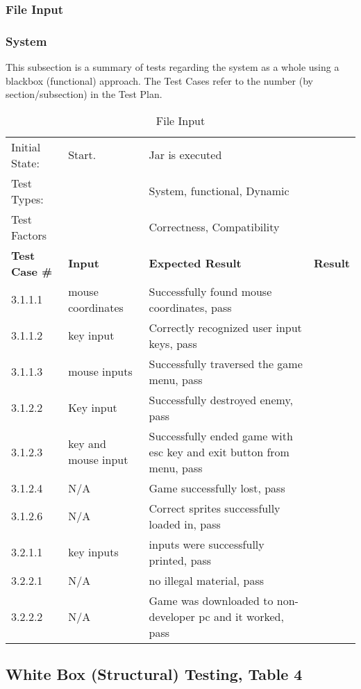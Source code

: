 \documentclass[12pt, oneside]{article}
\begin{document}
\subsubsection{File Input}

\subsubsection{System}
This subsection is a summary of tests regarding the system as a whole using a blackbox (functional) approach.  The Test Cases refer to the number (by section/subsection) in the Test Plan.

\begin{table}[ht]
\label{fin}
\caption{File Input}
\begin{tabular}{|p{} || p{} || p{} || p{}|}
\hline
Initial State: & Start.  &  Jar is executed  & \\
Test Types: & & System, functional, Dynamic & \\
Test Factors & & Correctness, Compatibility & \\
\hline
\hline
\textbf{Test Case \#} & \textbf{Input} & \textbf{Expected Result} & \textbf{Result} \\
\hline
3.1.1.1 & mouse coordinates & Successfully found mouse coordinates, pass \\
3.1.1.2 & key input & Correctly recognized user input keys, pass \\
3.1.1.3 & mouse inputs & Successfully traversed the game menu, pass \\
\hline
3.1.2.2 & Key input & Successfully destroyed enemy, pass \\
3.1.2.3 & key and mouse input & Successfully ended game with esc key and exit button from menu, pass\\
3.1.2.4 & N/A & Game successfully lost, pass\\
3.1.2.6 & N/A & Correct sprites successfully loaded in, pass\\
\hline
3.2.1.1 & key inputs & inputs were successfully printed, pass\\
\hline
3.2.2.1 & N/A & no illegal material, pass\\
3.2.2.2 & N/A & Game was downloaded to non-developer pc and it worked, pass\\
\hline 
\end{tabular} 
\end{table}


\subsection{White Box (Structural) Testing, Table 4}
\end{document}
